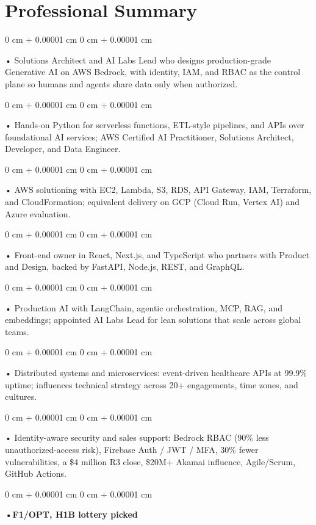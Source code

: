 \documentclass[10pt, letterpaper]{article}
\newenvironment{onecolentry}{
    \begin{adjustwidth}{
        0 cm + 0.00001 cm
    }{
        0 cm + 0.00001 cm
    }
}{
    \end{adjustwidth}
} %
\begin{document}
    \section{Professional Summary}
        \vspace{2 pt }
        \begin{onecolentry}
            • Solutions Architect and AI Labs Lead who designs production-grade Generative AI on AWS Bedrock, with identity, IAM, and RBAC as the control plane so humans and agents share data only when authorized.
        \end{onecolentry}
        \begin{onecolentry}
            • Hands-on Python for serverless functions, ETL-style pipelines, and APIs over foundational AI services; AWS Certified AI Practitioner, Solutions Architect, Developer, and Data Engineer.
        \end{onecolentry}
        \begin{onecolentry}
            • AWS solutioning with EC2, Lambda, S3, RDS, API Gateway, IAM, Terraform, and CloudFormation; equivalent delivery on GCP (Cloud Run, Vertex AI) and Azure evaluation.
        \end{onecolentry}
        \begin{onecolentry}
            • Front-end owner in React, Next.js, and TypeScript who partners with Product and Design, backed by FastAPI, Node.js, REST, and GraphQL.
        \end{onecolentry}
        \begin{onecolentry}
            • Production AI with LangChain, agentic orchestration, MCP, RAG, and embeddings; appointed AI Labs Lead for lean solutions that scale across global teams.
        \end{onecolentry}
        \begin{onecolentry}
            • Distributed systems and microservices: event-driven healthcare APIs at 99.9\% uptime; influences technical strategy across 20+ engagements, time zones, and cultures.
        \end{onecolentry}
        \begin{onecolentry}
            • Identity-aware security and sales support: Bedrock RBAC (90\% less unauthorized-access risk), Firebase Auth / JWT / MFA, 30\% fewer vulnerabilities, a \$4 million R3 close, \$20M+ Akamai influence, Agile/Scrum, GitHub Actions.
        \end{onecolentry}
        \begin{onecolentry}
                \textbf{•F1/OPT, H1B lottery picked}
        \end{onecolentry}
\end{document}
